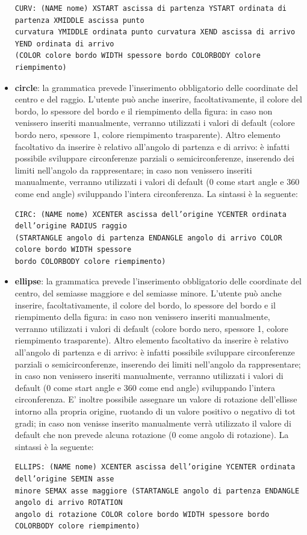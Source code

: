 \documentclass[a4paper]{article}
\begin{document}
\begin{itemize}
\begin{verbatim}
CURV: (NAME nome) XSTART ascissa di partenza YSTART ordinata di partenza XMIDDLE ascissa punto
curvatura YMIDDLE ordinata punto curvatura XEND ascissa di arrivo YEND ordinata di arrivo
(COLOR colore bordo WIDTH spessore bordo COLORBODY colore riempimento)
\end{verbatim}
\item \textbf{circle}: la grammatica prevede l'inserimento obbligatorio delle coordinate del centro e del raggio. L’utente può anche inserire, facoltativamente, il colore del bordo, lo spessore del bordo e il riempimento della figura: in caso non venissero inseriti manualmente, verranno utilizzati i valori di default (colore bordo nero, spessore 1, colore riempimento trasparente). Altro elemento facoltativo da inserire è relativo all’angolo di partenza e di arrivo: è infatti possibile sviluppare circonferenze parziali o semicirconferenze, inserendo dei limiti nell’angolo da rappresentare; in caso non venissero inseriti manualmente, verranno utilizzati i valori di default (0 come start angle e 360 come end angle) sviluppando l’intera circonferenza. La sintassi è la seguente:
\begin{verbatim}
CIRC: (NAME nome) XCENTER ascissa dell’origine YCENTER ordinata dell’origine RADIUS raggio
(STARTANGLE angolo di partenza ENDANGLE angolo di arrivo COLOR colore bordo WIDTH spessore
bordo COLORBODY colore riempimento)
\end{verbatim}
\item \textbf{ellipse}: la grammatica prevede l'inserimento obbligatorio delle coordinate del centro, del semiasse maggiore e del semiasse minore. L’utente può anche inserire, facoltativamente, il colore del bordo, lo spessore del bordo e il riempimento della figura: in caso non venissero inseriti manualmente, verranno utilizzati i valori di default (colore bordo nero, spessore 1, colore riempimento trasparente). Altro elemento facoltativo da inserire è relativo all’angolo di partenza e di arrivo: è infatti possibile sviluppare circonferenze parziali o semicirconferenze, inserendo dei limiti nell’angolo da rappresentare; in caso non venissero inseriti manualmente, verranno utilizzati i valori di default (0 come start angle e 360 come end angle) sviluppando l’intera circonferenza. E’ inoltre possibile assegnare un valore di rotazione dell’ellisse intorno alla propria origine, ruotando di un valore positivo o negativo di tot gradi; in caso non venisse inserito manualmente verrà utilizzato il valore di default che non prevede alcuna rotazione (0 come angolo di rotazione). La sintassi è la seguente:
\begin{verbatim}
ELLIPS: (NAME nome) XCENTER ascissa dell’origine YCENTER ordinata dell’origine SEMIN asse
minore SEMAX asse maggiore (STARTANGLE angolo di partenza ENDANGLE angolo di arrivo ROTATION
angolo di rotazione COLOR colore bordo WIDTH spessore bordo COLORBODY colore riempimento)
\end{verbatim}
\end{itemize}
\end{document}
